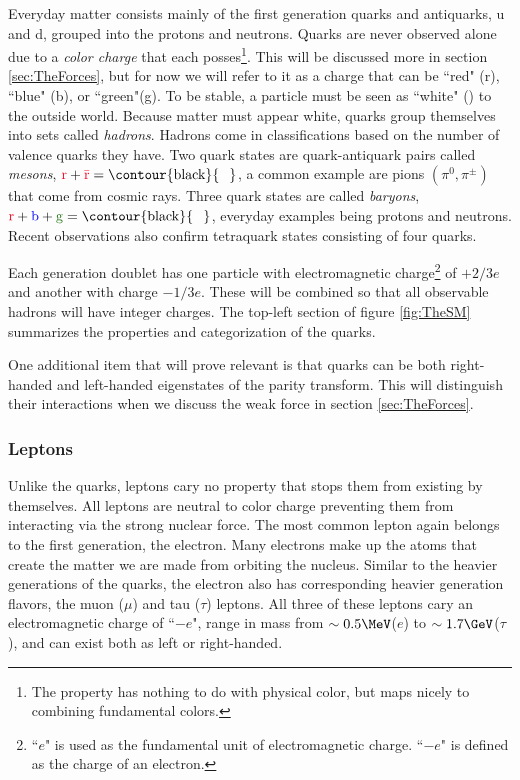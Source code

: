 Everyday matter consists mainly of the first generation quarks and antiquarks, u and d, grouped into the protons and neutrons. Quarks are never observed alone due to a \textit{color charge} that each posses\footnote{The property has nothing to do with physical color, but maps nicely to combining fundamental colors.}. This will be discussed more in section \ref{sec:TheForces}, but for now we will refer to it as a charge that can be ``red" (\textcolor{myred}{r}), ``blue" (\textcolor{myblue}{b}), or ``green"(\textcolor{mygreen}{g}). To be stable, a particle must be seen as  ``white" () to the outside world. Because matter must appear white, quarks group themselves into sets called \textit{hadrons}. Hadrons come in classifications based on the number of valence quarks they have. Two quark states are quark-antiquark pairs called \textit{mesons}, $\textrm{\textcolor{myred}{r}} + \textcolor{myred}{\bar{\textrm{r}}} = \textrm{\contour{black}{\textcolor{white}{w}}}$, a common example are pions $\left(\pi^{0},\pi^{\pm}\right)$ that come from cosmic rays. Three quark states are called \textit{baryons}, $\mathrm{\textcolor{myred}{r}} + \mathrm{\textcolor{myblue}{b}} + \mathrm{\textcolor{mygreen}{g}} = \mathrm{\contour{black}{\textcolor{white}{w}}}$, everyday examples being protons and neutrons. Recent observations also confirm tetraquark states \cite{Aaij:2014jqa} consisting of four quarks. 

Each generation doublet has one particle with electromagnetic charge\footnote{``$e$" is used as the fundamental unit of electromagnetic charge. ``$-e$" is defined as the charge of an electron.} of $+2/3 e$ and another with charge $-1/3 e$. These will be combined so that all observable hadrons will have integer charges. The top-left section of figure \ref{fig:TheSM} summarizes the properties and categorization of the quarks. 

One additional item that will prove relevant is that quarks can be both right-handed and left-handed eigenstates of the parity transform. This will distinguish their interactions when we discuss the weak force in section \ref{sec:TheForces}.

\subsubsection{Leptons}
\label{sec:TheLeptons}

Unlike the quarks, leptons cary no property that stops them from existing by themselves. All leptons are neutral to color charge preventing them from interacting via the strong nuclear force. The most common lepton again belongs to the first generation, the electron. Many electrons make up the atoms that create the matter we are made from orbiting the nucleus. Similar to the heavier generations of the quarks, the electron also has corresponding heavier generation flavors, the muon ($\mu$) and tau ($\tau$) leptons. All three of these leptons cary an electromagnetic charge of ``$-e$", range in mass from $\sim0.5\MeV$($e$) to $\sim1.7\GeV$($\tau$), and can exist both as left or right-handed.


